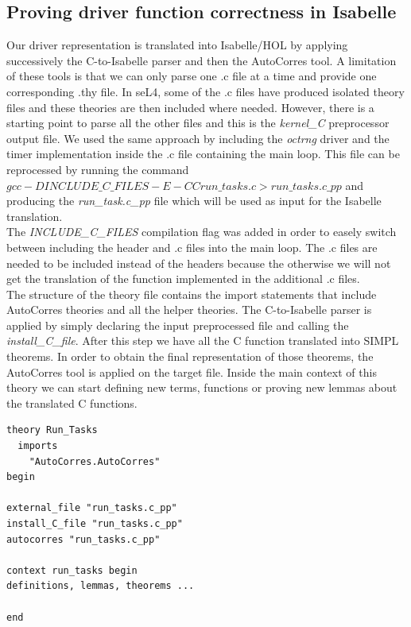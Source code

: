 \documentclass[conference]{IEEEtran}
\begin{document}
\subsection{Proving driver function correctness in Isabelle}
Our driver representation is translated into Isabelle/HOL by applying successively the C-to-Isabelle parser and then the AutoCorres tool. A limitation of these tools is that we can only parse one .c file at a time and provide one corresponding .thy file. In seL4, some of the .c files have produced isolated theory files and these theories are then included where needed. However, there is a starting point to parse all the other files and this is the \textit{kernel\_C} preprocessor output file. We used the same approach by including the \textit{octrng} driver and the timer implementation inside the .c file containing the main loop. This file can be reprocessed by running the command 
$gcc -DINCLUDE\_C\_FILES -E -CC run\_tasks.c > run\_tasks.c\_pp$ and producing the \textit{run\_task.c\_pp} file which will be used as input for the Isabelle translation.\\
The \textit{INCLUDE\_C\_FILES} compilation flag was added in order to easely switch between including the header and .c files into the main loop. The .c files are needed to be included instead of the headers because the otherwise we will not get the translation of the function implemented in the additional .c files. \\
The structure of the theory file contains the import statements that include AutoCorres theories and all the helper theories. The C-to-Isabelle parser is applied by simply declaring the input preprocessed file and calling the \textit{install\_C\_file}. After this step we have all the C function translated into SIMPL theorems. In order to obtain the final representation of those theorems, the AutoCorres tool is applied on the target file. Inside the main context of this theory we can start defining new terms, functions or proving new lemmas about the translated C functions.
\begin{lstlisting}[basicstyle=\small]
theory Run_Tasks
  imports 
    "AutoCorres.AutoCorres" 
begin

external_file "run_tasks.c_pp"
install_C_file "run_tasks.c_pp"
autocorres "run_tasks.c_pp"

context run_tasks begin
definitions, lemmas, theorems ...

end
\end{lstlisting}
\end{document}
